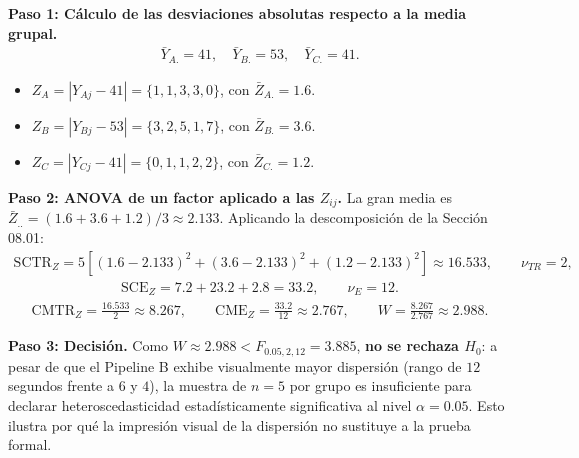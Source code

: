 \begin{solproblema}
	\textbf{Paso 1: Cálculo de las desviaciones absolutas respecto a la media grupal.}
	\begin{align}
		\bar{Y}_{A.} = 41, \quad \bar{Y}_{B.} = 53, \quad \bar{Y}_{C.} = 41.
	\end{align}
	\begin{itemize}
		\item $Z_{A} = |Y_{Aj} - 41| = \{1, 1, 3, 3, 0\}$, con $\bar{Z}_{A.} = 1.6$.
		\item $Z_{B} = |Y_{Bj} - 53| = \{3, 2, 5, 1, 7\}$, con $\bar{Z}_{B.} = 3.6$.
		\item $Z_{C} = |Y_{Cj} - 41| = \{0, 1, 1, 2, 2\}$, con $\bar{Z}_{C.} = 1.2$.
	\end{itemize}

	\textbf{Paso 2: ANOVA de un factor aplicado a las $Z_{ij}$.}
	La gran media es $\bar{Z}_{..} = (1.6+3.6+1.2)/3 \approx 2.133$. Aplicando la descomposición de la Sección 08.01:
	\begin{align}
		\text{SCTR}_Z = 5\left[(1.6-2.133)^2+(3.6-2.133)^2+(1.2-2.133)^2\right] \approx 16.533, \qquad \nu_{TR}=2,
	\end{align}
	\begin{align}
		\text{SCE}_Z = 7.2 + 23.2 + 2.8 = 33.2, \qquad \nu_E = 12.
	\end{align}
	\begin{align}
		\text{CMTR}_Z = \frac{16.533}{2} \approx 8.267, \qquad \text{CME}_Z = \frac{33.2}{12} \approx 2.767, \qquad W = \frac{8.267}{2.767} \approx 2.988.
	\end{align}

	\textbf{Paso 3: Decisión.}
	Como $W \approx 2.988 < F_{0.05,2,12} = 3.885$, \textbf{no se rechaza $H_0$}: a pesar de que el Pipeline B exhibe visualmente mayor dispersión (rango de $12$ segundos frente a $6$ y $4$), la muestra de $n=5$ por grupo es insuficiente para declarar heteroscedasticidad estadísticamente significativa al nivel $\alpha=0.05$. Esto ilustra por qué la impresión visual de la dispersión no sustituye a la prueba formal.
\end{solproblema}

